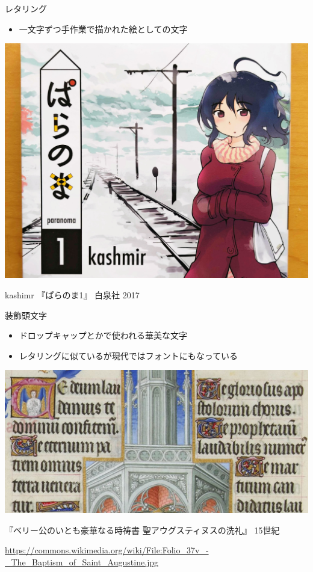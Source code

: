 \documentclass[unicode,14pt]{beamer}
\begin{document}
\begin{frame}[t]{レタリング}
  \sffamily
  \begin{itemize}
\item 一文字ずつ手作業で描かれた絵としての文字
  \end{itemize}
  \begin{center}
    \includegraphics[width=.50\textwidth]{figures/paranoma.jpg}
  \end{center}
\raggedleft\tiny\color{50gray} kashimr 『ぱらのま1』 白泉社 2017
\end{frame}

\begin{frame}[t]{装飾頭文字}
  \sffamily
  \begin{itemize}
\item ドロップキャップとかで使われる華美な文字
\item レタリングに似ているが現代ではフォントにもなっている
  \end{itemize}
  \begin{center}
    \includegraphics[width=.50\textwidth]{figures/Folio_37v.png}
  \end{center}
\raggedleft\tiny\color{50gray} 『ベリー公のいとも豪華なる時祷書 聖アウグスティヌスの洗礼』 15世紀\par
\url{https://commons.wikimedia.org/wiki/File:Folio_37v_-_The_Baptism_of_Saint_Augustine.jpg}
\end{frame}
\end{document}
